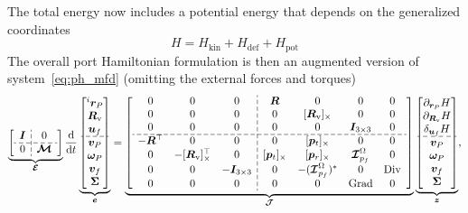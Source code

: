 \documentclass{svjour3}                     %
\DeclareMathOperator*{\Grad}{Grad}
\DeclareMathOperator*{\Div}{Div}
\newcommand{\crmat}[1]{\ensuremath{[#1]_{\times}}}
\begin{document}
The total energy now includes a potential energy that depends on the generalized coordinates
\begin{equation*}
H = H_{\text{kin}} + H_{\text{def}} + H_{\text{pot}}
\end{equation*}
The overall port Hamiltonian formulation is then an augmented version of system~\eqref{eq:ph_mfd} (omitting the external forces and torques)
\begin{equation}
\label{eq:ph_mfd_all}
\setlength{\dashlinegap}{2pt}
\underbrace{
	{\left[ \begin{array}{c:c}
		\bm{I} & 0 \\
		\hdashline
		0 & \bm{\mathcal{M}} \\
		\end{array} \right]}
}_{\bm{\mathcal{E}}}
\diff{}{t}
\underbrace{\begin{bmatrix}
^i \bm{r}_P \\ \bm{R}_{\text{v}} \\ \bm{u}_f \\\hdashline  \bm{v}_P \\ \bm\omega_P  \\ \bm{v}_f  \\ \bm\Sigma \\
\end{bmatrix}}_{\bm{e}} = 
\underbrace{
	{\left[ \begin{array}{ccc:cccc}
		0 & 0 & 0 &  \bm{R} & 0 & 0 & 0 \\
		0 & 0 & 0 & 0 & \crmat{\bm{R}_{\text{v}}} & 0 & 0 \\
		0 & 0 & 0 & 0 & 0 & \bm{I}_{3\times 3} & 0 \\ 
		\hdashline 
		-\bm{R}^\top & 0 & 0 & 0 & \crmat{\bm{p}_t} & 0 & 0 \\
		0 & -\crmat{\bm{R}_{\text{v}}}^\top & 0 & \crmat{\bm{p}_t} & \crmat{\bm{p}_r} & \bm{\mathcal{I}}_{p_f}^\Omega & 0 \\
		0 & 0 & -\bm{I}_{3\times 3} & 0 & -(\bm{\mathcal{I}}_{p_f}^\Omega)^* & 0 & \Div \\
		0 & 0 & 0 & 0 & 0 & \Grad & 0 \\
		\end{array} \right]}
	}_{\bm{\mathcal{J}}}
\underbrace{\begin{bmatrix}
\partial_{\bm{r}_P}H \\ \partial_{\bm{R}_\text{v}}H \\ \delta_{\bm{u}_f} H \\\hdashline  \bm{v}_P \\ \bm\omega_P  \\ \bm{v}_f  \\ \bm\Sigma \\
\end{bmatrix}}_{\bm{z}},
\end{equation} 
\end{document}
